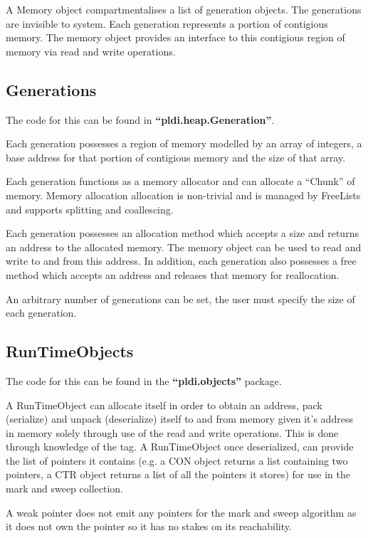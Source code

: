 \documentclass{article}
\begin{document}
A Memory object compartmentalises a list of generation objects. The generations are invisible to system. Each generation represents a portion of contigious memory. The memory object provides an interface to this contigious region of memory via read and write operations. 

\subsection{Generations}

The code for this can be found in \textbf{``pldi.heap.Generation''}.

Each generation possesses a region of memory modelled by an array of integers, a base address for that portion of contigious memory and the size of that array. 

Each generation functions as a memory allocator and can allocate a ``Chunk'' of memory. Memory allocation allocation is non-trivial and is managed by FreeLists and supports splitting and coallescing. 

Each generation possesses an allocation method which accepts a size and returns an address to the allocated memory. The memory object can be used to read and write to and from this address. In addition, each generation also possesses a free method which accepts an address and releases that memory for reallocation.

An arbitrary number of generations can be set, the user must specify the size of each generation. 

\subsection{RunTimeObjects}

The code for this can be found in the  \textbf{``pldi.objects''} package.

A RunTimeObject can allocate itself in order to obtain an address, pack (serialize) and unpack (deserialize) itself to and from memory given it's address in memory solely through use of the read and write operations. This is done through knowledge of the tag. A RunTimeObject once deserialized, can provide the list of pointers it contains (e.g. a CON object returns a list containing two pointers, a CTR object returns a list of all the pointers it stores) for use in the mark and sweep collection.

A weak pointer does not emit any pointers for the mark and sweep algorithm as it does not own the pointer so it has no stakes on its reachability. 
\end{document}
